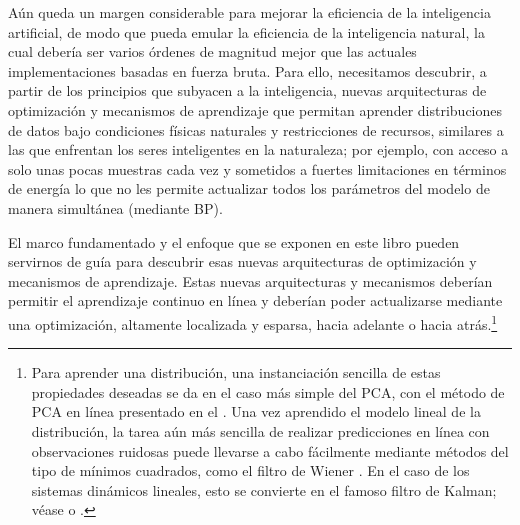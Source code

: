 \documentclass[../../book-main_es.tex]{subfiles}
\begin{document}
Aún queda un margen considerable para mejorar la eficiencia de la inteligencia artificial,
de modo que pueda emular la eficiencia de la inteligencia natural,
la cual debería ser varios órdenes de magnitud mejor que
las actuales implementaciones basadas en fuerza bruta. Para ello, necesitamos descubrir, a partir
de los principios que subyacen a la inteligencia, 
nuevas arquitecturas de optimización y mecanismos de aprendizaje que permitan
aprender distribuciones de datos bajo condiciones físicas naturales y
restricciones de recursos, similares a las que enfrentan los seres inteligentes en
la naturaleza; por ejemplo, con acceso a solo unas pocas muestras cada vez y sometidos a fuertes 
limitaciones en términos de energía lo que no les permite actualizar
todos los parámetros del modelo de manera simultánea (mediante BP).

El marco fundamentado y el enfoque que se exponen en este libro pueden servirnos de guía
para descubrir esas nuevas arquitecturas de optimización y mecanismos de aprendizaje. Estas nuevas
arquitecturas y mecanismos deberían permitir el aprendizaje continuo en línea
y deberían poder actualizarse mediante una optimización, altamente localizada y esparsa, 
hacia adelante o hacia atrás.\footnote{Para aprender una distribución, una
    instanciación sencilla de estas propiedades deseadas se da en el caso más simple del
    PCA, con el método de PCA en línea presentado en el
    . Una vez aprendido el modelo lineal de la
    distribución, la tarea aún más sencilla de realizar predicciones en línea
    con observaciones ruidosas puede llevarse a cabo fácilmente mediante métodos del tipo de mínimos cuadrados,
    como el filtro de Wiener \cite{Wiener-1942,Wiener-1949}. En el caso de los sistemas dinámicos lineales, esto se convierte en el famoso
filtro de Kalman; véase \cite[Apéndice B]{MaY2003} o \citep{peng2025mathematics}.}
  
\end{document}
